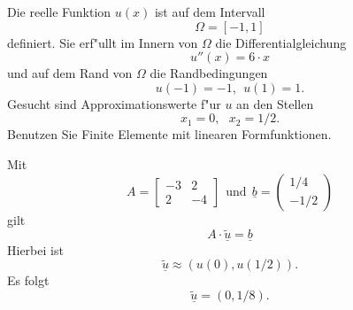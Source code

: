 Die reelle Funktion $u(x)$ ist auf dem Intervall
\[
\Omega = [-1, 1]
\]
definiert. Sie erf"ullt im Innern von $\Omega$ die Differentialgleichung 
\[
u''(x) = 6 \cdot x
\]
und auf dem Rand von $\Omega$ die Randbedingungen 
\[
u(-1) = -1, \ \ u(1) = 1.
\]
Gesucht sind Approximationswerte f"ur $u$ an den Stellen
\[
x_1 = 0, \ \ \  x_2 = 1/2.
\]
Benutzen Sie Finite Elemente mit linearen Formfunktionen.

\begin{loesung}
Mit
\[
A = \left[\begin{array}{rr} -3 & 2 \\ 2 & -4  \end{array}\right] \ \ \text{und} \ \
  \underline{b} =  \left(\begin{array}{r} 1/4 \\ -1/2 \end{array}\right)
\]
gilt  
\[
A \cdot \underline{\tilde u} = \underline{b}
\]
Hierbei ist
\[
\underline{\tilde u} \approx (u(0), u(1/2)).
\]
Es folgt 
\[
\underline{\tilde u} = (0, 1/8).
\]
\end{loesung}

